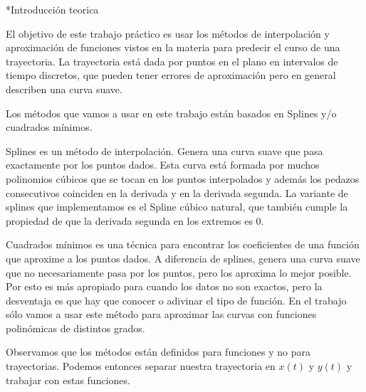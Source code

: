 \documentclass[12pt,titlepage]{article}
\newenvironment{usection}[1]{\newpage\begin{section}*{#1}	\addcontentsline{toc}{section}{#1}}{\end{section}}
\begin{document}



\begin{titlepage}
\maketitle
\end{titlepage}
\tableofcontents
\newpage

	\begin{usection}{Introducción teorica}
		El objetivo de este trabajo práctico es usar los métodos de interpolación y aproximación de funciones vistos en la materia para predecir el curso de una trayectoria.
		La trayectoria está dada por puntos en el plano en intervalos de tiempo discretos, que pueden tener errores de aproximación pero en general describen una curva suave.
		
		Los métodos que vamos a usar en este trabajo están basados en Splines y/o cuadrados mínimos.
		
		Splines es un método de interpolación. Genera una curva suave que pasa exactamente por los puntos dados.
		Esta curva está formada por muchos polinomios cúbicos que se tocan en los puntos interpolados y además los pedazos consecutivos coinciden en la derivada y en la derivada segunda.
		La variante de splines que implementamos es el Spline cúbico natural, que también cumple la propiedad de que la derivada segunda en los extremos es 0.
		
		Cuadrados mínimos es una técnica para encontrar los coeficientes de una función que aproxime a los puntos dados.
		A diferencia de splines, genera una curva suave que no necesariamente pasa por los puntos, pero los aproxima lo mejor posible.
		Por esto es más apropiado para cuando los datos no son exactos, pero la desventaja es que hay que conocer o adivinar el tipo de función.
		En el trabajo sólo vamos a usar este método para aproximar las curvas con funciones polinómicas de distintos grados.
		
		Observamos que los métodos están definidos para funciones y no para trayectorias. Podemos entonces separar nuestra trayectoria en $x(t)$ y $y(t)$ y trabajar con estas funciones.
	\end{usection}
\end{document}
